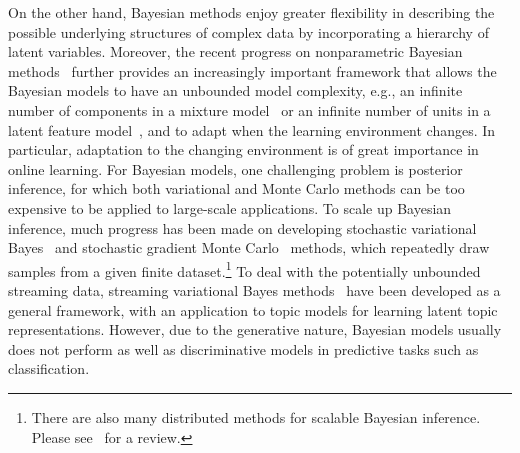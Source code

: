 \documentclass[twoside,11pt]{article}
\begin{document}
On the other hand, Bayesian methods enjoy greater flexibility in describing the possible underlying structures of complex data by incorporating a hierarchy of latent variables. Moreover, the recent progress on nonparametric Bayesian methods~\citep{hjort2010bayesian,teh2006hierarchical} further provides an increasingly important framework that allows the Bayesian models to have an unbounded model complexity, e.g., an infinite number of components in a mixture model~\citep{hjort2010bayesian} or an infinite number of units in a latent feature model~\citep{Griffiths:tr05}, and to adapt when the learning environment changes. In particular, adaptation to the changing environment is of great importance in online learning. For Bayesian models, one challenging problem is posterior inference, for which both variational and Monte Carlo methods can be too expensive to be applied to large-scale applications. To scale up Bayesian inference, much progress has been made on developing stochastic variational Bayes~\citep{hoffman2013stochastic,mimno2012sparse} and stochastic gradient Monte Carlo~\citep{welling2011bayesian,welling2012mc} methods, which repeatedly draw samples from a given finite dataset.\footnote{There are also many distributed methods for scalable Bayesian inference. Please see~\citep{Zhu:bigBayes2014} for a review. } To deal with the potentially unbounded streaming data, streaming variational Bayes methods~\citep{broderick2013streaming} have been developed as a general framework, with an application to topic models for learning latent topic representations. However, due to the generative nature, Bayesian models usually does not perform as well as discriminative models in predictive tasks such as classification.
\end{document}
